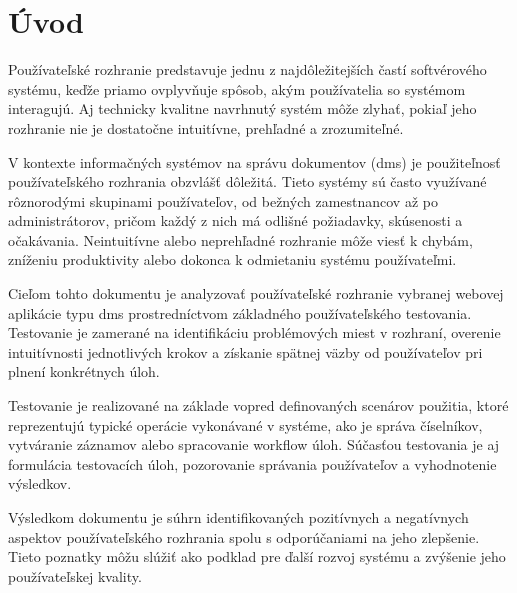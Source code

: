 ﻿\section*{Úvod}

Používateľské rozhranie predstavuje jednu z najdôležitejších častí softvérového systému, keďže priamo ovplyvňuje spôsob, akým používatelia so systémom interagujú. 
Aj technicky kvalitne navrhnutý systém môže zlyhať, pokiaľ jeho rozhranie nie je dostatočne intuitívne, prehľadné a zrozumiteľné.

V kontexte informačných systémov na správu dokumentov (\gls{dms}) je použiteľnosť používateľského rozhrania obzvlášť dôležitá. Tieto systémy sú často využívané rôznorodými skupinami používateľov, 
od bežných zamestnancov až po administrátorov, pričom každý z nich má odlišné požiadavky, skúsenosti a očakávania. Neintuitívne alebo neprehľadné rozhranie môže viesť k chybám, zníženiu produktivity alebo dokonca k odmietaniu systému používateľmi.

Cieľom tohto dokumentu je analyzovať používateľské rozhranie vybranej webovej aplikácie typu \gls{dms} prostredníctvom základného používateľského testovania. 
Testovanie je zamerané na identifikáciu problémových miest v rozhraní, overenie intuitívnosti jednotlivých krokov a získanie spätnej väzby od používateľov pri plnení konkrétnych úloh.

Testovanie je realizované na základe vopred definovaných scenárov použitia, ktoré reprezentujú typické operácie vykonávané v systéme, ako je správa číselníkov, vytváranie záznamov alebo spracovanie workflow úloh. 
Súčasťou testovania je aj formulácia testovacích úloh, pozorovanie správania používateľov a vyhodnotenie výsledkov.

Výsledkom dokumentu je súhrn identifikovaných pozitívnych a negatívnych aspektov používateľského rozhrania spolu s odporúčaniami na jeho zlepšenie. 
Tieto poznatky môžu slúžiť ako podklad pre ďalší rozvoj systému a zvýšenie jeho používateľskej kvality.

\clearpage

